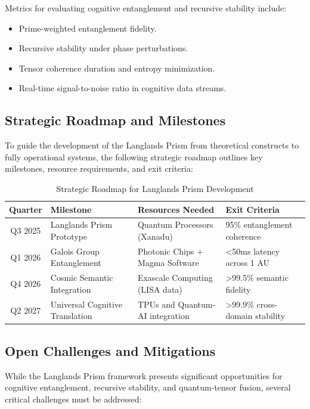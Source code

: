 \documentclass[11pt]{article}
\begin{document}
Metrics for evaluating cognitive entanglement and recursive stability include:

\begin{itemize}
    \item Prime-weighted entanglement fidelity.
    \item Recursive stability under phase perturbations.
    \item Tensor coherence duration and entropy minimization.
    \item Real-time signal-to-noise ratio in cognitive data streams.
\end{itemize}

\subsection{Strategic Roadmap and Milestones}

To guide the development of the Langlands Prism from theoretical constructs to fully operational systems, the following strategic roadmap outlines key milestones, resource requirements, and exit criteria:

\begin{table}[h!]
\centering
\begin{tabular}{|c|l|l|l|}
\hline
\textbf{Quarter} & \textbf{Milestone} & \textbf{Resources Needed} & \textbf{Exit Criteria} \\
\hline
Q3 2025 & Langlands Prism Prototype & Quantum Processors (Xanadu) & 95\% entanglement coherence \\
\hline
Q1 2026 & Galois Group Entanglement & Photonic Chips + Magma Software & <50ms latency across 1 AU \\
\hline
Q4 2026 & Cosmic Semantic Integration & Exascale Computing (LISA data) & >99.5\% semantic fidelity \\
\hline
Q2 2027 & Universal Cognitive Translation & TPUs and Quantum-AI integration & >99.9\% cross-domain stability \\
\hline
\end{tabular}
\caption{Strategic Roadmap for Langlands Prism Development}
\label{tab:roadmap}
\end{table}

\subsection{Open Challenges and Mitigations}

While the Langlands Prism framework presents significant opportunities for cognitive entanglement, recursive stability, and quantum-tensor fusion, several critical challenges must be addressed:
\end{document}
